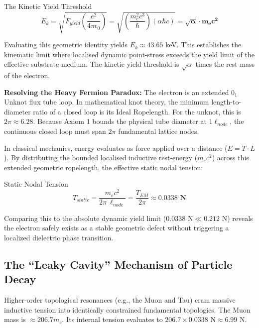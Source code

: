 \begin{resultbox}{The Kinetic Yield Threshold}
\begin{equation}
E_{k}=\sqrt{F_{yield}\left(\frac{e^{2}}{4\pi\epsilon_{0}}\right)}=\sqrt{\left(\frac{m_{e}^{2}c^{3}}{\hbar}\right)(\alpha\hbar c)}=\mathbf{\sqrt{\alpha}\cdot m_{e}c^{2}}
\end{equation}
\end{resultbox}

Evaluating this geometric identity yields $E_{k}\approx43.65$ keV. This establishes the kinematic limit where localised dynamic point-stress exceeds the yield limit of the effective substrate medium. The kinetic yield threshold is $\sqrt{\alpha}$ times the rest mass of the electron.

\textbf{Resolving the Heavy Fermion Paradox:} The electron is an extended $0_{1}$ Unknot flux tube loop. In mathematical knot theory, the minimum length-to-diameter ratio of a closed loop is its Ideal Ropelength. For the unknot, this is $2\pi \approx 6.28$. Because Axiom 1 bounds the physical tube diameter at $1\ell_{node}$, the continuous closed loop must span $2\pi$ fundamental lattice nodes.

In classical mechanics, energy evaluates as force applied over a distance ($E=T\cdot L$). By distributing the bounded localised inductive rest-energy ($m_{e}c^{2}$) across this extended geometric ropelength, the effective static nodal tension:

\begin{resultbox}{Static Nodal Tension}
\begin{equation}
T_{static}=\frac{m_{e}c^{2}}{2\pi\ \ell_{node}}=\frac{T_{EM}}{2\pi}\approx\mathbf{0.0338\text{ N}}
\end{equation}
\end{resultbox}

Comparing this to the absolute dynamic yield limit ($0.0338\text{ N}\ll0.212\text{ N}$) reveals the electron safely exists as a stable geometric defect without triggering a localized dielectric phase transition.

\subsection{The ``Leaky Cavity'' Mechanism of Particle Decay}

Higher-order topological resonances (e.g., the Muon and Tau) cram massive inductive tension into identically constrained fundamental topologies. The Muon mass is $\approx206.7m_{e}$. Its internal tension evaluates to $206.7\times0.0338\text{ N}\approx6.99\text{ N}$.

